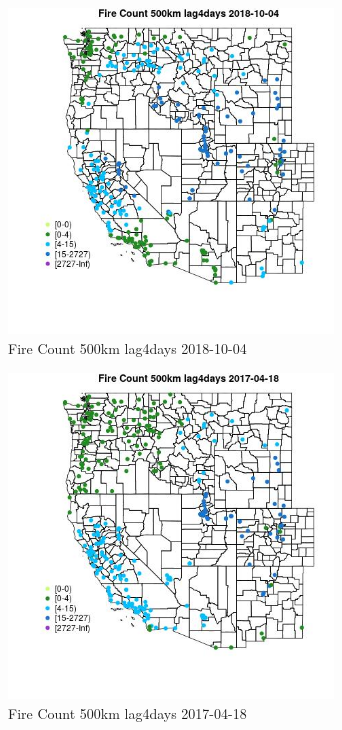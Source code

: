 \begin{figure} 
\centering  
\includegraphics[width=0.77\textwidth]{Code_Outputs/Report_ML_input_PM25_Step4_part_f_de_duplicated_aves_prioritize_24hr_obswNAs_MapObsFire_Count_500km_lag4days2018-10-04.jpg} 
\caption{\label{fig:Report_ML_input_PM25_Step4_part_f_de_duplicated_aves_prioritize_24hr_obswNAsMapObsFire_Count_500km_lag4days2018-10-04}Fire Count 500km lag4days 2018-10-04} 
\end{figure} 
 

\begin{figure} 
\centering  
\includegraphics[width=0.77\textwidth]{Code_Outputs/Report_ML_input_PM25_Step4_part_f_de_duplicated_aves_prioritize_24hr_obswNAs_MapObsFire_Count_500km_lag4days2017-04-18.jpg} 
\caption{\label{fig:Report_ML_input_PM25_Step4_part_f_de_duplicated_aves_prioritize_24hr_obswNAsMapObsFire_Count_500km_lag4days2017-04-18}Fire Count 500km lag4days 2017-04-18} 
\end{figure} 
 

